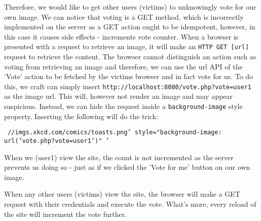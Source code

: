 \documentclass[a4paper, 12pt]{article}
\begin{document}
Therefore, we would like to get other users (victims) to unknowingly vote for our own image. We can notice that voting is a GET method, which is incorrectly implemented on the server as a GET action ought to be idempotent, however, in this case it causes side effects - increments vote counter. When a browser is presented with a request to retrieve an image, it will make an \texttt{HTTP GET [url]} request to retrieve the content. The browser cannot distinguish an action such as voting from retrieving an image and therefore, we can use the url API of the 'Vote' action to be fetched by the victims browser and in fact vote for us. To do this, we craft can simply insert \texttt{http://localhost:8080/vote.php?vote=user1} as the image url. This will, however not render an image and may appear suspicious. Instead, we can hide the request inside a \texttt{background-image} style property. Inserting the following will do the trick:

\texttt{
\newline //imgs.xkcd.com/comics/toasts.png'
\newline style="background-image: url('vote.php?vote=user1')" '}

When we (user1) view the site, the count is not incremented as the server prevents us doing so - just as if we clicked the 'Vote for me' button on our own image.

When any other users (victims) view the site, the browser will make a GET request with their credentials and execute the vote. What's more, every reload of the site will increment the vote further.

\newpage


\end{document}

